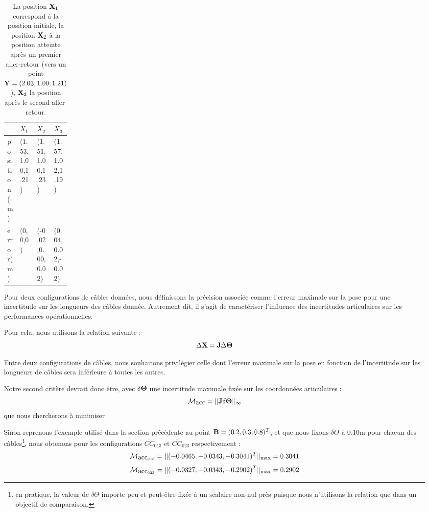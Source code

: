 \begin{table}[!h]
\begin{tabularx}{0.95\linewidth}{|p{0.15\linewidth}|X|X|X|}
\hline
& $X_1 $ & $X_2$ & $X_3$ \\
\hline
position(m) & (1.53,1.00,1.21) & (1.51,1.00,1.23) & (1.57,1.02,1.19)\\
\hline
error(m) & (0,0,0) & (-0.02,0.00,0.02) & (0.04,0.02,-0.02) \\
\hline
\end{tabularx}
\caption{La position ${\bf X}_1$ correspond \`a la position initiale, la 
position ${\bf X}_2$ \`a la position atteinte apr\`es un premier aller-retour 
(vers un point ${\bf Y} = (2.03,1.00,1.21)$), ${\bf X}_2$ la position apr\`es 
le second aller-retour.} 
\label{chap03:tab01}
\end{table}

Pour deux configurations de c\^ables donn\'ees, nous d\'efinissons la 
pr\'ecision associ\'ee comme l'erreur maximale sur la pose pour une incertitude 
sur les longueurs des c\^ables donn\'ee. Autrement dit, il s'agit de 
caract\'eriser l'influence des incertitudes articulaires sur les performances 
op\'erationnelles.

Pour cela, nous utilisons la relation suivante :
\begin{equation}
\Delta {\bf X} = {\bf J} \Delta {\bf \Theta}
\label{chap03:eq10}
\end{equation}

Entre deux configurations de c\^ables, nous souhaitons privil\'egier celle dont 
l'erreur maximale sur la pose en fonction de l'incertitude sur les longueurs de 
c\^ables sera inf\'erieure \`a toutes les autres.

Notre second crit\`ere devrait donc \^etre, avec $\delta {\bf \Theta}$ une 
incertitude maximale fix\'ee sur les coordonn\'ees articulaires :
\begin{equation}
\mathcal M_{\hbox{acc}} = ||{\bf J}  \delta {\bf \Theta} ||_{\infty}
\label{chap03:eq11}
\end{equation}
que nous chercherons \`a minimiser

Sinon reprenons l'exemple utilis\'e dans la section pr\'ec\'edente au point 
${\bf B} = (0.2,0.3,0.8)^T$, et que nous fixons $\delta \Theta$ \`a $0.10$m 
pour chacun des c\^ables\footnote{en pratique, la valeur de $\delta \Theta$ 
importe peu et peut-\^etre fix\'ee \`a un scalaire non-nul pr\`es 
puisque nous n'utilisons la relation que dans un objectif de comparaison.}, 
nous obtenons pour les configurations $\overline{CC}_{013}$ et 
$\overline{CC}_{023}$ respectivement :
$$\mathcal M_{\hbox{acc}_{013}} = ||(-0.0465, -0.0343, -0.3041)^T||_{\max} = 
0.3041$$ 
$$\mathcal M_{\hbox{acc}_{023}} = ||(-0.0327,-0.0343,-0.2902)^T||_{\max} = 
0.2902$$

